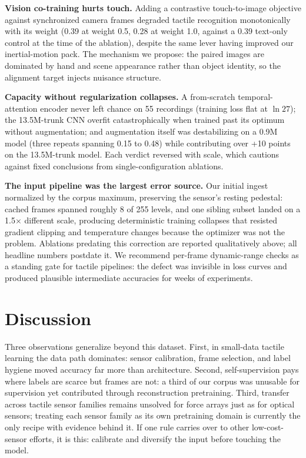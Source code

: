 \documentclass[conference]{IEEEtran}
\begin{document}
\textbf{Vision co-training hurts touch.} Adding a contrastive touch-to-image objective
against synchronized camera frames degraded tactile recognition monotonically with its
weight (0.39 at weight 0.5, 0.28 at weight 1.0, against a 0.39 text-only control at the
time of the ablation), despite the same lever having improved our inertial-motion pack.
The mechanism we propose: the paired images are dominated by hand and scene appearance
rather than object identity, so the alignment target injects nuisance structure.

\textbf{Capacity without regularization collapses.} A from-scratch temporal-attention
encoder never left chance on 55 recordings (training loss flat at $\ln 27$); the 13.5M-trunk CNN
overfit catastrophically when trained past its optimum without augmentation; and
augmentation itself was destabilizing on a 0.9M model (three repeats spanning 0.15 to
0.48) while contributing over +10 points on the 13.5M-trunk model. Each verdict reversed with
scale, which cautions against fixed conclusions from single-configuration ablations.

\textbf{The input pipeline was the largest error source.} Our initial ingest normalized by
the corpus maximum, preserving the sensor's resting pedestal: cached frames spanned roughly
8 of 255 levels, and one sibling subset landed on a 1.5$\times$ different scale, producing
deterministic training collapses that resisted gradient clipping and temperature changes
because the optimizer was not the problem. Ablations predating this correction are reported
qualitatively above; all headline numbers postdate it. We recommend per-frame dynamic-range
checks as a standing gate for tactile pipelines: the defect was invisible in loss curves
and produced plausible intermediate accuracies for weeks of experiments.

\section{Discussion}
Three observations generalize beyond this dataset. First, in small-data tactile learning
the data path dominates: sensor calibration, frame selection, and label hygiene moved
accuracy far more than architecture. Second, self-supervision pays where labels are scarce
but frames are not: a third of our corpus was unusable for supervision yet contributed
through reconstruction pretraining. Third, transfer across tactile sensor families remains
unsolved for force arrays just as for optical sensors; treating each sensor family as its
own pretraining domain is currently the only recipe with evidence behind it. If one rule
carries over to other low-cost-sensor efforts, it is this: calibrate and diversify the
input before touching the model.
\end{document}
